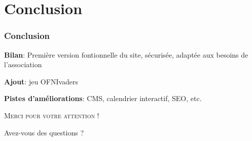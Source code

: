 \section{Conclusion}

\begin{frame}
    \frametitle{Conclusion}
    \centering
    \textbf{Bilan}: Première version fontionnelle du site, sécurisée, adaptée aux besoins de l’association
    \vspace{1cm}

    \textbf{Ajout}: jeu OFNIvaders
    \vspace{1cm}

    \textbf{Pistes d'améliorations}: CMS, calendrier interactif, SEO, etc.
\end{frame}

\begin{frame}
    \scshape\huge\centering
    \vspace{1cm}
    Merci pour votre attention !\par
    \vspace{2cm}
    Avez-vous des questions ?\par
\end{frame}
